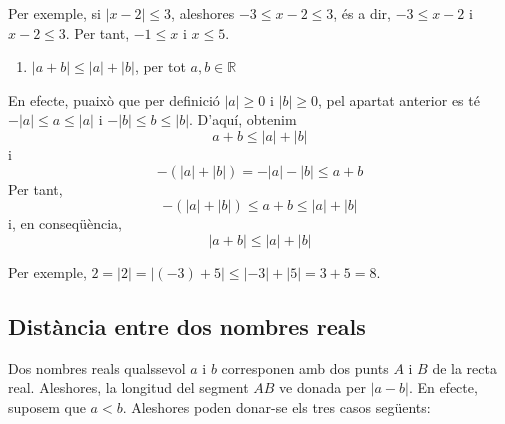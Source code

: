 Per exemple, si $\left\vert x-2\right\vert \leq 3$, aleshores $-3\leq x-2\leq
3$, és a dir, $-3\leq x-2$ i $x-2\leq 3$. Per tant, $-1\leq x$ i $x\leq 5$.

\begin{enumerate}
\item[5.] $\left\vert a+b\right\vert \leq \left\vert a\right\vert
+\left\vert b\right\vert $, per tot $a,b\in \mathbb{R}$
\end{enumerate}

En efecte, puaixò que per definició $\left\vert a\right\vert \geq 0$ i $%
\left\vert b\right\vert \geq 0$, pel apartat anterior es té $%
-\left\vert a\right\vert \leq a\leq \left\vert a\right\vert$ i $-\left\vert
b\right\vert \leq b\leq \left\vert b\right\vert $. D’aquí, obtenim%
\begin{equation*}
a+b\leq \left\vert a\right\vert +\left\vert b\right\vert
\end{equation*}%
i%
\begin{equation*}
-(\left\vert a\right\vert +\left\vert b\right\vert )=-\left\vert
a\right\vert -\left\vert b\right\vert \leq a+b
\end{equation*}%
Per tant,%
\begin{equation*}
-(\left\vert a\right\vert +\left\vert b\right\vert )\leq a+b\leq \left\vert
a\right\vert +\left\vert b\right\vert
\end{equation*}%
i, en conseqüència,%
\begin{equation*}
\left\vert a+b\right\vert \leq \left\vert a\right\vert +\left\vert
b\right\vert
\end{equation*}

Per exemple, $2=\left\vert 2\right\vert =\left\vert (-3)+5\right\vert \leq
\left\vert -3\right\vert +\left\vert 5\right\vert =3+5=8$.

\subsection{Distància entre dos nombres reals}

Dos nombres reals qualssevol $a$ i $b$ corresponen amb dos punts 
$A$ i $B$ de la recta real. Aleshores, la longitud del segment $AB$ ve
donada per $\left\vert a-b\right\vert $. En efecte, suposem que $a<b$.
Aleshores poden donar-se els tres casos següents:

